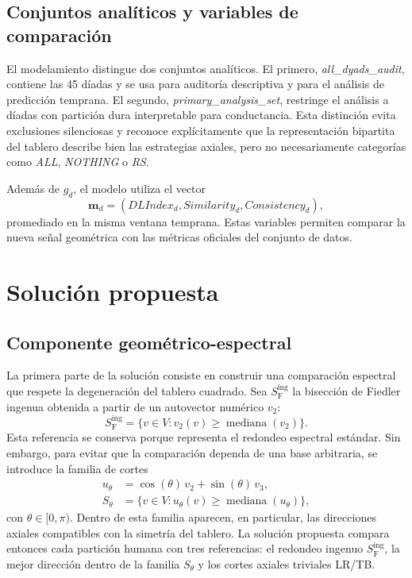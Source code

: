 \documentclass[journal]{IEEEtran}
\newcommand{\Sing}{S^{\mathrm{ing}}_{\mathrm{F}}}
\begin{document}
\subsection{Conjuntos analíticos y variables de comparación}

El modelamiento distingue dos conjuntos analíticos. El primero, \emph{all\_dyads\_audit}, contiene las 45 díadas y se usa para auditoría descriptiva y para el análisis de predicción temprana. El segundo, \emph{primary\_analysis\_set}, restringe el análisis a díadas con partición dura interpretable para conductancia. Esta distinción evita exclusiones silenciosas y reconoce explícitamente que la representación bipartita del tablero describe bien las estrategias axiales, pero no necesariamente categorías como \emph{ALL}, \emph{NOTHING} o \emph{RS}.

Además de $g_d$, el modelo utiliza el vector
\[
\mathbf{m}_d=(DLIndex_d, Similarity_d, Consistency_d),
\]
promediado en la misma ventana temprana. Estas variables permiten comparar la nueva señal geométrica con las métricas oficiales del conjunto de datos.

\section{Solución propuesta}

\subsection{Componente geométrico-espectral}

La primera parte de la solución consiste en construir una comparación espectral que respete la degeneración del tablero cuadrado. Sea $\Sing$ la bisección de Fiedler ingenua obtenida a partir de un autovector numérico $v_2$:
\begin{equation}
\Sing = \{v \in V : v_2(v) \ge \operatorname{mediana}(v_2)\}.
\end{equation}
Esta referencia se conserva porque representa el redondeo espectral estándar. Sin embargo, para evitar que la comparación dependa de una base arbitraria, se introduce la familia de cortes
\begin{align}
u_\theta &= \cos(\theta)\,v_2 + \sin(\theta)\,v_3,\\
S_\theta &= \{v \in V : u_\theta(v) \ge \operatorname{mediana}(u_\theta)\},
\end{align}
con $\theta \in [0,\pi)$. Dentro de esta familia aparecen, en particular, las direcciones axiales compatibles con la simetría del tablero. La solución propuesta compara entonces cada partición humana con tres referencias: el redondeo ingenuo $\Sing$, la mejor dirección dentro de la familia $S_\theta$ y los cortes axiales triviales LR/TB.
\end{document}
